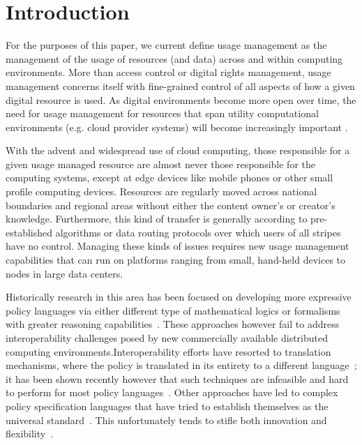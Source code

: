 \section{Introduction}
For the purposes of this paper, we current define usage management as the management of the usage of resources (and data) across and within computing environments.  More than access control or digital rights management, usage management concerns itself with fine-grained control of all aspects of how a given digital resource is used.  As digital environments become more open over time, the need for usage management for resources that span utility computational environments (e.g. cloud provider systems) will become increasingly important \cite{ctrl:lamb-MCCCS}.

With the advent and widespread use of cloud computing, those responsible for a given usage managed resource are almost never those responsible for the computing systems, except at edge devices like mobile phones or other small profile computing devices.  Resources are regularly moved across national boundaries and regional areas without either the content owner's or creator's knowledge.  Furthermore, this kind of transfer is generally according to pre-established algorithms or data routing protocols over which users of all stripes have no control.  Managing these kinds of issues requires new usage management capabilities that can run on platforms ranging from small, hand-held devices to nodes in large data centers.

Historically research in this area has been focused on developing more expressive policy languages via either different type of mathematical logics or formalisms with greater reasoning capabilities~\cite{ArHu:07,BaMi:06,ChCoEtHaJoLa:03,HaWe:04,HaWe:08,PuWe:02,XiBjFu:08}.  These approaches however fail to address interoperability challenges posed by new commercially available distributed computing environments.Interoperability efforts have resorted to translation mechanisms, where the policy is translated in its entirety to a different language~\cite{HeJa:05,PoPrDe:04,ScTaWo:04}; it has been shown recently however that such techniques are infeasible and hard to perform for most policy languages~\cite{KoLaMaMi:04, SaShUe:04}. Other approaches have led to complex policy specification languages that have tried to establish themselves as the universal standard~\cite{OMADRM,ODRL-req,Wa:04,XrML-spec}.  This unfortunately tends to stifle both innovation and flexibility~\cite{HeJa:05,JaHe:04,JaHe:08,JaHeMa:06}.

